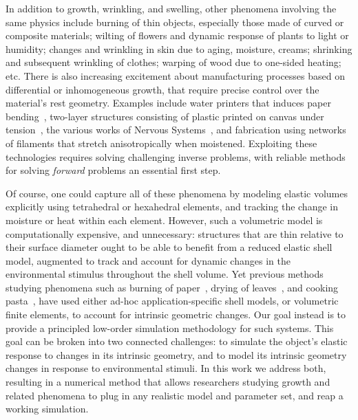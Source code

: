 \documentclass[timestamp,acmtog]{acmart}
\begin{document}
In addition to growth, wrinkling, and swelling, other phenomena involving the same physics include burning of thin objects, especially those made of curved or composite materials; wilting of flowers and dynamic response of plants to light or humidity; changes and wrinkling in skin due to aging, moisture, creams; shrinking and subsequent wrinkling of clothes; warping of wood due to one-sided heating; etc. There is also increasing excitement about manufacturing processes based on differential or inhomogeneous growth, that require precise control over the material's rest geometry. Examples include water printers that induces paper bending~\cite{Guberan2012}, two-layer structures consisting of plastic printed on canvas under tension~\cite{Perez2017}, the various works of Nervous Systems~\cite{NervousSystems}, and fabrication using networks of filaments that stretch anisotropically when moistened. Exploiting these technologies requires solving challenging inverse problems, with reliable methods for solving \emph{forward} problems an essential first step. 

Of course, one could capture all of these phenomena by modeling elastic volumes explicitly using tetrahedral or hexahedral elements, and tracking the change in moisture or heat within each element. However, such a volumetric model is computationally expensive, and unnecessary: structures that are thin relative to their surface diameter ought to be able to benefit from a reduced elastic shell model, augmented to track and account for dynamic changes in the environmental stimulus throughout the shell volume. Yet previous methods studying phenomena such as burning of paper~\cite{Liu2009}, drying of leaves~\cite{Jeong2013}, and cooking pasta~\cite{Wang2017}, have used either ad-hoc application-specific shell models, or volumetric finite elements, to account for intrinsic geometric changes. Our goal instead is to provide a principled low-order simulation methodology for such systems. This goal can be broken into two connected challenges: to simulate the object's elastic response to changes in its intrinsic geometry, and to model its intrinsic geometry changes in response to environmental stimuli. In this work we address both, resulting in a numerical method that allows researchers studying growth and related phenomena to plug in any realistic model and parameter set, and reap a working simulation.
\end{document}
